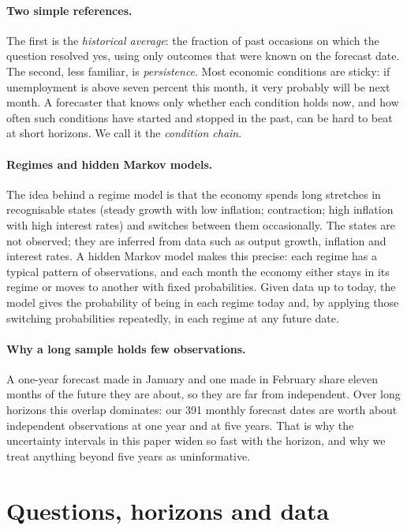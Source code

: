 \documentclass[11pt]{article}
\begin{document}
\paragraph{Two simple references.} The first is the \emph{historical average}: the fraction of past
occasions on which the question resolved yes, using only outcomes that were known on the forecast date.
The second, less familiar, is \emph{persistence}. Most economic conditions are sticky: if unemployment is
above seven percent this month, it very probably will be next month. A forecaster that knows only
whether each condition holds now, and how often such conditions have started and stopped in the past,
can be hard to beat at short horizons. We call it the \emph{condition chain}.

\paragraph{Regimes and hidden Markov models.} The idea behind a regime model is that the economy spends
long stretches in recognisable states (steady growth with low inflation; contraction; high inflation with
high interest rates) and switches between them occasionally. The states are not observed; they are
inferred from data such as output growth, inflation and interest rates. A hidden Markov model makes this
precise: each regime has a typical pattern of observations, and each month the economy either stays in
its regime or moves to another with fixed probabilities. Given data up to today, the model gives the
probability of being in each regime today and, by applying those switching probabilities repeatedly, in
each regime at any future date.

\paragraph{Why a long sample holds few observations.} A one-year forecast made in January and one made in
February share eleven months of the future they are about, so they are far from independent. Over
long horizons this overlap dominates: our 391 monthly forecast dates are worth about
\IndependentObservationsOneYear{} independent observations at one year and \IndependentObservationsFiveYears{}
at five years. That is why the uncertainty intervals in this paper widen so fast with the horizon, and why
we treat anything beyond five years as uninformative.

\section{Questions, horizons and data}\label{sec:data}
\end{document}

